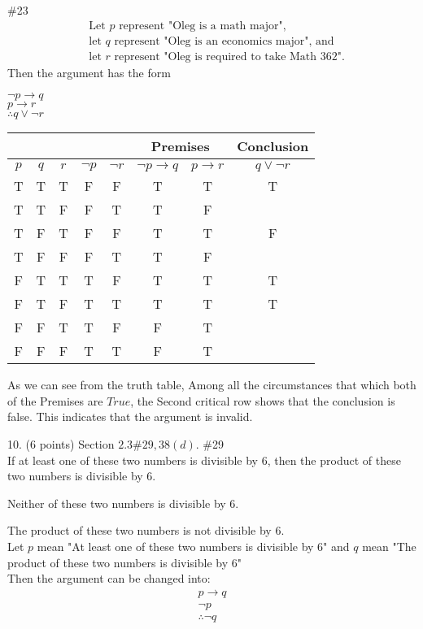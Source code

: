 \documentclass{article}
\begin{document}
\#23\\
\begin{align*}
     &\text{Let } p \text{ represent "Oleg is a math major",} \\
    &\text{let } q \text{ represent "Oleg is an economics major", and} \\
    &\text{let } r \text{ represent "Oleg is required to take Math 362".}
\end{align*}
Then the argument has the form\\
\begin{center}
$\neg p \rightarrow q$\\
$p \rightarrow r$\\
$\therefore q \vee \neg r$

    \begin{tabular}{|c|c|c|c|c|c|c|c|}
    \hline
    \multicolumn{5}{|c|}{} & \multicolumn{2}{|c|}{Premises} & \multicolumn{1}{|c|}{Conclusion}\\
    \hline
        $p$ & $q$ & $r$ & $\neg p$ & $\neg r$ & $\neg p \rightarrow q$ & $p 
        \rightarrow r$& $ q \vee \neg r $ \\
    \hline
        T & T & T & F & F & T & T & T \\
        T & T & F & F & T & T & F &   \\
        T & F & T & F & F & T & T & F\\
        T & F & F & F & T & T & F &   \\
        F & T & T & T & F & T & T & T \\
        F & T & F & T & T & T & T & T \\
        F & F & T & T & F & F & T &   \\
        F & F & F & T & T & F & T &   \\ 
    \hline
    \end{tabular}
\end{center}
As we can see from the truth table, Among all the circumstances that which both of the Premises are $True$, the Second critical row shows that the conclusion is false.
This indicates that the argument is invalid.



10. (6 points) Section $2.3 \# 29,38(d)$.
\#29\\
If at least one of these two numbers is divisible by 6, then the product of these two numbers is divisible by 6.

Neither of these two numbers is divisible by 6.
 
The product of these two numbers is not divisible by 6.\\
Let $p$ mean "At least one of these two numbers is divisible by 6"
and $q$ mean "The product of these two numbers is divisible by 6"\\
Then the argument can be changed into:\\
\begin{align*}
    p \rightarrow q \\
    \neg p\\
    \therefore \neg q \tag{Invalid: inverse error}
\end{align*}
\end{document}
